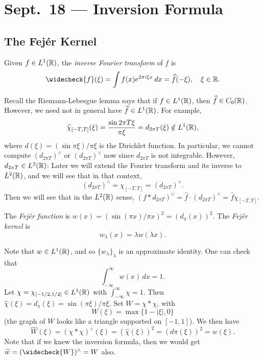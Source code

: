 \chapter{Sept.~18 --- Inversion Formula}

\section{The Fej\'er Kernel}

\begin{definition}
  Given $f \in L^1(\mathbb{R})$, the
  \emph{inverse Fourier transform} of $f$ is
  \[
    \widecheck{f}(\xi)
    = \int f(x) e^{2\pi i \xi x}\, dx
    = \widehat{f}(-\xi), \quad \xi \in \R.
  \]
\end{definition}

\begin{remark}
  Recall the Riemann-Lebesgue lemma says that
  if $f \in L^1(\mathbb{R})$, then
  $\widehat{f} \in C_0(\mathbb{R})$. However, we need not in
  general have $\widehat{f} \in L^1(\mathbb{R})$.
  For example,
  \[
    \widehat{\chi}_{[-T, T]}(\xi)
    = \frac{\sin 2\pi T \xi}{\pi \xi}
    = d_{2\pi T}(\xi) \notin L^1(\mathbb{R}),
  \]
  where $d(\xi) = (\sin \pi \xi) / \pi \xi$
  is the Dirichlet function. In particular,
  we cannot compute $(d_{2\pi T})^\wedge$
  or $(d_{2\pi T})^\vee$ now since $d_{2\pi T}$
  is not integrable. However, $d_{2\pi T} \in L^2(\mathbb{R})$:
  Later we will extend the
  Fourier transform and its inverse to $L^2(\mathbb{R})$, and
  we will see that in that context,
  \[
    (d_{2\pi T})^{\wedge} = \chi_{[-T, T]} = (d_{2\pi T})^\vee.
  \]
  Then we will see that in the $L^2(\mathbb{R})$ sense,
  $(f * d_{2\pi T})^\vee = \widehat{f} \cdot (d_{2\pi T})^\wedge = \widehat{f} \chi_{[-T, T]}$.
\end{remark}

\begin{definition}
  The \emph{Fej\'er function} is
  $w(x) = (\sin (\pi x) / \pi x)^2 = (d_{\pi} (x))^2$.
  The \emph{Fej\'er kernel} is
  \[w_\lambda(x) = \lambda w(\lambda x).\]
\end{definition}

\begin{remark}
  Note that $w \in L^1(\mathbb{R})$, and so
  $\{w_\lambda\}_\lambda$ is an approximate identity.
  One can check that
  \[
    \int_{-\infty}^\infty w(x)\, dx = 1.
  \]
  Let $\chi = \chi_{[-1 / 2, 1 / 2]} \in L^1(\mathbb{R})$
  with $\int_{-\infty}^\infty \chi = 1$.
  Then $\widehat{\chi}(\xi) = d_\pi(\xi) = \sin(\pi \xi) / \pi \xi$.
  Set
  $W = \chi * \chi$, with
  \[
    W(\xi) = \max\{1 - |\xi|, 0\}
  \]
  (the graph of $W$ looks like a triangle supported
  on $[-1, 1]$). We then have
  \[
    \widehat{W}(\xi)
    = (\chi * \chi)^\wedge(\xi)
    = (\widehat{\chi}(\xi))^2
    = (d\pi(\xi))^2 = w(\xi).
  \]
  Note that if we knew the inversion formula,
  then we would get
  $\widehat{w} = (\widecheck{W})^\wedge = W$ also.
\end{remark}

